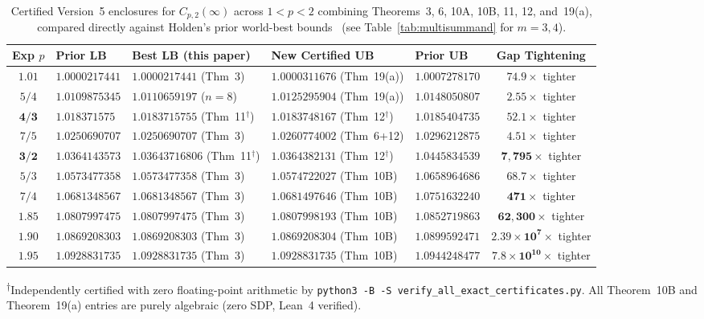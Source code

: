 \documentclass[10pt,letterpaper]{article}
\begin{document}
\begin{table}[htbp]
\centering
\caption{\small Certified Version~5 enclosures for $C_{p,2}(\infty)$ across $1 < p < 2$ combining Theorems~3, 6, 10A, 10B, 11, 12, and~19(a), compared directly against Holden's prior world-best bounds~\cite{Holden2026b} (see Table~\ref{tab:multisummand} for $m = 3, 4$).}
\vspace{3pt}
\footnotesize
\setlength{\tabcolsep}{3.6pt}
\begin{tabular}{@{}c l l l l c@{}}
\toprule
\textbf{Exp $p$} & \textbf{Prior LB} & \textbf{Best LB (this paper)} & \textbf{New Certified UB} & \textbf{Prior UB~\cite{Holden2026b}} & \textbf{Gap Tightening} \\
\midrule
$1.01$ & $1.0000217441$ & $1.0000217441$ (Thm~3) & $\mathbf{1.0000311676}$ (Thm~19(a)) & $1.0007278170$ & $\mathbf{74.9\times}$ tighter \\
$5/4$  & $1.0109875345$ & $1.0110659197$ ($n=8$) & $\mathbf{1.0125295904}$ (Thm~19(a)) & $1.0148050807$ & $\mathbf{2.55\times}$ tighter \\
$\mathbf{4/3}$ & $1.018371575$ & $\mathbf{1.0183715755}$ (Thm~11$^\dagger$) & $\mathbf{1.0183748167}$ (Thm~12$^\dagger$) & $1.0185404735$ & $\mathbf{52.1\times}$ tighter \\
$7/5$  & $1.0250690707$ & $1.0250690707$ (Thm~3) & $\mathbf{1.0260774002}$ (Thm~6+12) & $1.0296212875$ & $\mathbf{4.51\times}$ tighter \\
$\mathbf{3/2}$ & $1.0364143573$ & $\mathbf{1.03643716806}$ (Thm~11$^\dagger$) & $\mathbf{1.0364382131}$ (Thm~12$^\dagger$) & $1.0445834539$ & $\mathbf{7{,}795\times}$ tighter \\
$5/3$  & $1.0573477358$ & $1.0573477358$ (Thm~3) & $\mathbf{1.0574722027}$ (Thm~10B) & $1.0658964686$ & $\mathbf{68.7\times}$ tighter \\
$7/4$  & $1.0681348567$ & $1.0681348567$ (Thm~3) & $\mathbf{1.0681497646}$ (Thm~10B) & $1.0751632240$ & $\mathbf{471\times}$ tighter \\
$1.85$ & $1.0807997475$ & $1.0807997475$ (Thm~3) & $\mathbf{1.0807998193}$ (Thm~10B) & $1.0852719863$ & $\mathbf{62{,}300\times}$ tighter \\
$1.90$ & $1.0869208303$ & $1.0869208303$ (Thm~3) & $\mathbf{1.0869208304}$ (Thm~10B) & $1.0899592471$ & $\mathbf{2.39\times 10^7\times}$ tighter \\
$1.95$ & $1.0928831735$ & $1.0928831735$ (Thm~3) & $\mathbf{1.0928831735}$ (Thm~10B) & $1.0944248477$ & $\mathbf{7.8\times 10^{10}\times}$ tighter \\
\bottomrule
\end{tabular}
\vspace{4pt}
\par\parbox{0.96\textwidth}{\footnotesize\textsuperscript{$\dagger$}Independently certified with zero floating-point arithmetic by \texttt{python3 -B -S verify\_all\_exact\_certificates.py}. All Theorem~10B and Theorem~19(a) entries are purely algebraic (zero SDP, Lean~4 verified).}
\label{tab:enclosures}
\end{table}
\end{document}
